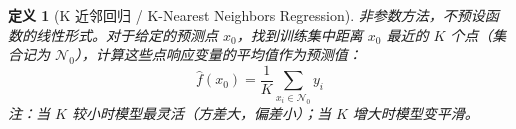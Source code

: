 \documentclass[UTF8]{ctexart}
\newtheorem{definition}[theorem]{定义}
\numberwithin{equation}{section}
\begin{document}
\begin{definition}[K 近邻回归 / K-Nearest Neighbors Regression]
非参数方法，不预设函数的线性形式。对于给定的预测点 $x_0$，找到训练集中距离 $x_0$ 最近的 $K$ 个点（集合记为 $\mathcal{N}_0$），计算这些点响应变量的平均值作为预测值：
\begin{equation}
\hat{f}(x_0) = \frac{1}{K} \sum_{x_i \in \mathcal{N}_0} y_i
\end{equation}
\emph{注：当 $K$ 较小时模型最灵活（方差大，偏差小）；当 $K$ 增大时模型变平滑。}
\end{definition}
\end{document}
